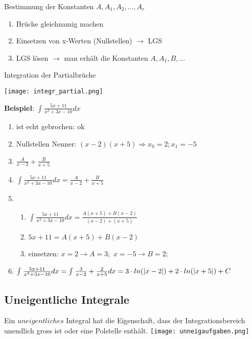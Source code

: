 \begin{multicols*}{3}
    { Bestimmung der Konstanten $A,A_1,A_2,...,A_r$}
    \begin{enumerate}
        \itemsep0em
        \item Brüche gleichnamig machen
        \item Einsetzen von x-Werten (Nullstellen) $\rightarrow$ LGS
        \item LGS lösen $\rightarrow$ man erhält die Konstanten $A,A_1,B,...$
    \end{enumerate}


    { Integration der Partialbrüche}

    \texttt{[image: integr\_partial.png]}

    {\textbf{Beispiel}: \large $\int_{}^{}\frac{5x+11}{x^2+3x-10}dx $ }
    \begin{enumerate}
        \itemsep-0.3em
        \item ist echt gebrochen: ok
        \item Nullstellen Nenner: $ (x-2)(x+5) \Rightarrow x_0 = 2; x_1 = -5$
        \item $ \frac{A}{x-2}+\frac{B}{x+5}$
        \item \large $\int_{}^{}\frac{5x+11}{x^2+3x-10}dx  = \frac{A}{x-2}+\frac{B}{x+5}$
        \item     \begin{enumerate}
                  \itemsep-0.3em
                  \item    $\int_{}^{}\frac{5x+11}{x^2+3x-10}dx = \frac{A(x+5)+B(x-2)}{(x-2) +(x+5) }$
                  \item \small $5x + 11 = A(x+5)+B(x-2) $
                  \item  {\small einsetzen:  $ x = 2 \rightarrow A=3; $ $ x = -5 \rightarrow B=2; $}
              \end{enumerate}
        \item  $\int_{}^{}\frac{5x+11}{x^2+3x-10}dx =\int_{}^{}\frac{3}{x-2}+\frac{2}{x+5}dx  \newline = 3\cdot ln(|x-2|) + 2\cdot ln(|x+5|) + C $
    \end{enumerate}

    \subsection{Uneigentliche Integrale}
    { Ein $uneigentliches$ Integral hat die Eigenschaft, dass der Integrationsbereich unendlich gross
        ist oder eine Polstelle enthält.}
    \texttt{[image: unneigaufgaben.png]}


\end{multicols*}
